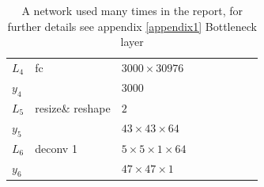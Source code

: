 \begin{table}[h!]
{\begin{tabular}{|lllllllll|}
    \multicolumn{1}{|l|}{$L_4$}   & fc       & \multicolumn{1}{l|}{$3000\times30976$}              &          & \multicolumn{1}{l|}{}            \\
    \multicolumn{1}{|l|}{$y_4$}   &          & \multicolumn{1}{l|}{$3000$}                         &          & \multicolumn{1}{l|}{}            \\ \hline
    \multicolumn{1}{|l|}{$L_5$}   & resize\& reshape & \multicolumn{1}{l|}{$2$}                    &          & \multicolumn{1}{l|}{}            \\
    \multicolumn{1}{|l|}{$y_5$}   &            & \multicolumn{1}{l|}{$43\times43\times 64$}          &          & \multicolumn{1}{l|}{}            \\ \hline
    \multicolumn{1}{|l|}{$L_6$}   & deconv 1   & \multicolumn{1}{l|}{$5\times 5\times1\times 64$}  &          & \multicolumn{1}{l|}{}            \\
    \multicolumn{1}{|l|}{$y_6$}   &            & \multicolumn{1}{l|}{$47\times47\times1$}            &          & \multicolumn{1}{l|}{}             \\ \hline
    \end{tabular}

    \caption{A network used many times in the report, for further details see appendix \ref{appendix1} \label{tab:net2}
    \newline *Bottleneck layer}
    }
    \end{table}

